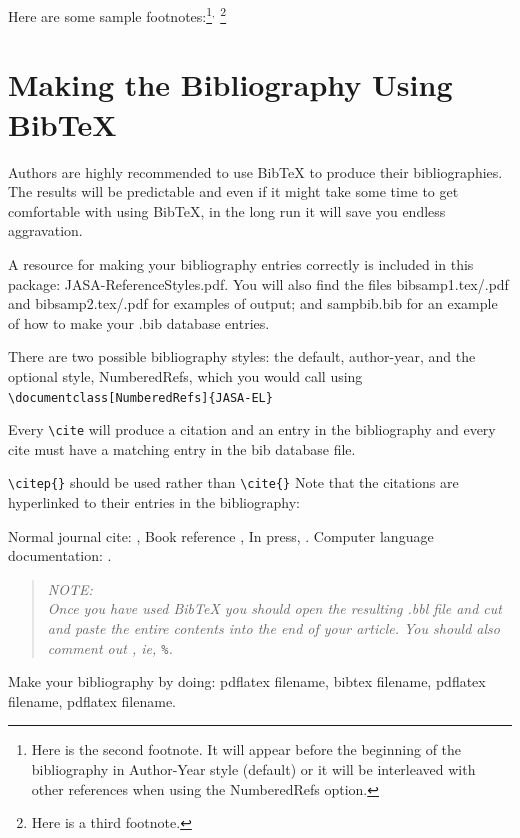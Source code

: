 \documentclass{JASA-EL}
\begin{document}
Here are some sample footnotes:\footnote{Here is the second footnote.
It will appear before the beginning of the bibliography in Author-Year
style (default) or it will be 
 interleaved with other references when using the Numbered\-Refs
 option.}$^,$%
\footnote{Here is a third footnote.}


\section{Making the Bibliography Using BibTeX}
Authors are highly  recommended to use BibTeX to produce their
bibliographies. The results will be predictable and even if
it might take some time to get comfortable with  using BibTeX,
in the long run it will save you endless aggravation.

A resource for making your bibliography entries
correctly is included in this package: 
JASA-ReferenceStyles.pdf. You will also find
the files
bibsamp1.tex/.pdf and bibsamp2.tex/.pdf
for examples of output; and sampbib.bib for an example of
how to make your .bib database entries.

There are two possible bibliography styles: the default, author-year,
and the optional style, Numbered\-Refs, which you would call using\\
{\verb+\documentclass[NumberedRefs]{JASA-EL}+ }

Every \verb+\cite+ will produce a citation and an entry in the
bibliography and every cite must have a matching entry in the bib
database file.

\verb+\citep{}+ should be used rather than \verb+\cite{}+
Note that the citations are hyperlinked to their entries in the
bibliography:

Normal journal cite: \citep{joursamp1},
 Book reference \citep{booksamp1},
In press, \citep{inpress3}. 
Computer language documentation:
\citep{sampcode2}.


\begin{quote}
\it
NOTE:\\
Once you have used BibTeX you
should open the resulting .bbl file and cut and paste the entire contents 
into the end of your article. You should also comment out
\verb++, ie,
\verb+%+.
\end{quote}

Make your bibliography by doing: pdflatex filename,  bibtex filename,
pdflatex filename, pdflatex filename.
\end{document}
